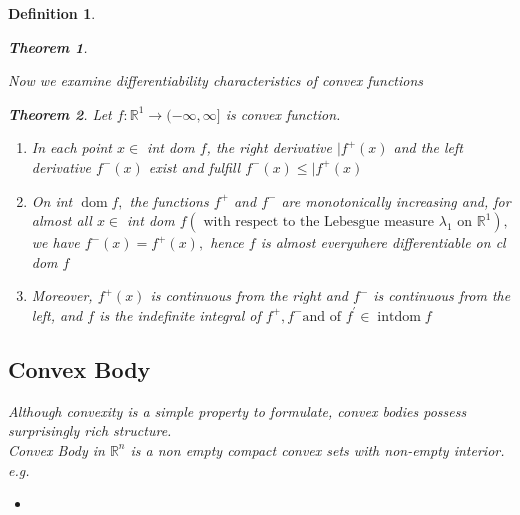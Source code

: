 \documentclass[oneside]{book}
\newtheorem{theorem}{Theorem}[section]
\newtheorem{mydef}{Definition}
\begin{document}
\begin{mydef}
\begin{theorem}
\end{theorem}	
	
Now we examine differentiability characteristics of convex functions	
\begin{theorem}	
\label{t:7.9}
 Let $f: \mathbb{R}^{1} \rightarrow(-\infty, \infty]$ is convex function.	
\begin{enumerate}	
    \item 	
 In each point $x \in$ int dom $f$, the right derivative $| f^{+}(x)$ and the left derivative $f^{-}(x)$ exist and fulfill $f^{-}(x) \leq | f^{+}(x)$	
\\	
\item	
 On int $\operatorname{dom} f,$ the functions $f^{+}$ and $f^{-}$ are monotonically increasing and, for almost all	
$x \in$ int dom $f\left(\text { with respect to the Lebesgue measure } \lambda_{1} \text { on } \mathbb{R}^{1}\right),$ we have $f^{-}(x)=f^{+}(x),$ hence $f$ is almost everywhere differentiable on cl dom $f$	
\\	
\item	
 Moreover, $f^{+}(x)$	
is continuous from the right and $f^{-}$ is continuous from the left, and $f$ is the indefinite integral of $ f^{+}, f^{-} \text {and of } f^{\prime} \in \operatorname{int dom} f$
\end{enumerate}	






\end{theorem}








\begin{comment}
\begin{mydef} \label{d:12}
A function $f: \mathbb{R}^{n} \rightarrow(-\infty, \infty]$ is \textbf{positively homogeneous} of degree 1 if
$$
f(\alpha x)=\alpha f(x), \quad \text { for all } x \in \mathbb{R}^{n}, \alpha \geq 0
$$
$f$ is convex if and only if it is subadditive, given  $f$ is positively homogeneous  as
$$
 f(x+y) \leq f(x)+f(y)  \text{ and }f(\alpha x)=\alpha f(x) $$,
  \quad $ \text { for all } R$
  gives definition of convex function
\end{mydef}
\end{comment}
 \subsection{Convex Body}
 \label{ss:18}
 Although convexity is a simple property to formulate, convex bodies possess surprisingly rich structure. \\
Convex Body in  $\mathbb{R}^n$  is a non empty compact convex sets with non-empty interior.
e.g.
\begin{itemize}
    \item
    

\end{itemize}
\end{mydef}
\end{document}
